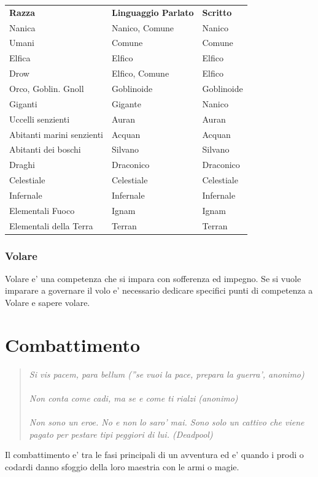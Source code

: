 \documentclass[a4paper,11pt,twoside,openany]{book}
\begin{document}
	\begin{tabular}{lll}
		\toprule
		\textbf{Razza} & \textbf{Linguaggio Parlato}& \textbf{Scritto}\tabularnewline
		Nanica & Nanico, Comune & Nanico\tabularnewline
		Umani & Comune & Comune\tabularnewline
		Elfica & Elfico & Elfico\tabularnewline
		Drow & Elfico, Comune & Elfico\tabularnewline
		Orco, Goblin. Gnoll & Goblinoide & Goblinoide\tabularnewline
		Giganti & Gigante & Nanico\tabularnewline
		Uccelli senzienti & Auran & Auran\tabularnewline
		Abitanti marini senzienti & Acquan & Acquan\tabularnewline
		Abitanti dei boschi & Silvano & Silvano\tabularnewline
		Draghi & Draconico & Draconico\tabularnewline
		Celestiale & Celestiale & Celestiale\tabularnewline
		Infernale & Infernale & Infernale\tabularnewline
		Elementali Fuoco & Ignam & Ignam\tabularnewline
		Elementali della Terra & Terran & Terran\tabularnewline
		
	\end{tabular}
	
	\subsubsection{Volare}
	
	\label{volare}
	
	Volare e' una competenza che si impara con sofferenza ed impegno. Se si vuole imparare a governare il volo e' necessario dedicare specifici punti di competenza a Volare e sapere volare.
	
	\pagebreak
	
	\section{Combattimento}
	
	\label{combattimento}
	\begin{quote}\textit{
			Si vis pacem, para bellum (''se vuoi la pace, prepara la guerra', anonimo)\\\\
			Non conta come cadi, ma se e come ti rialzi (anonimo)\\\\
			Non sono un eroe. No e non lo saro' mai. Sono solo un cattivo che viene pagato per pestare tipi peggiori di lui. (Deadpool)
	}\end{quote}
	
	Il combattimento e' tra le fasi principali di un avventura ed e' quando i prodi o codardi danno sfoggio della loro maestria con le armi o magie.
	
\end{document}
